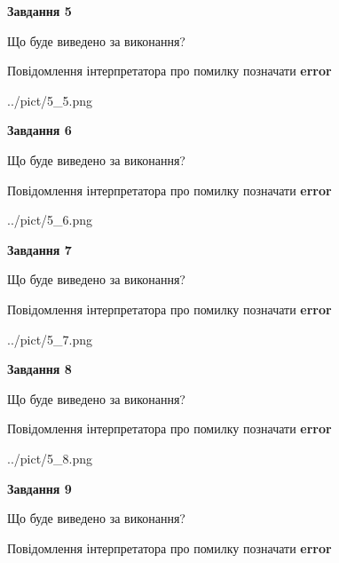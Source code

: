 \documentclass[11pt, ukrainian]{article}
\begin{document}
{\begin {large}
{\begin {center}\textbf{Завдання 5}\end {center}}\par
Що буде виведено за виконання? \par
Повідомлення інтерпретатора про помилку позначати \textbf{error}

\begin{center}
	{../pict/5_5.png}
\end{center}
\newpage

{\begin {center}\textbf{Завдання 6}\end {center}}\par
Що буде виведено за виконання? \par
Повідомлення інтерпретатора про помилку позначати \textbf{error}

\begin{center}
	{../pict/5_6.png}
\end{center}
\newpage

{\begin {center}\textbf{Завдання 7}\end {center}}\par
Що буде виведено за виконання? \par
Повідомлення інтерпретатора про помилку позначати \textbf{error}

\begin{center}
	{../pict/5_7.png}
\end{center}
\newpage

{\begin {center}\textbf{Завдання 8}\end {center}}\par
Що буде виведено за виконання? \par
Повідомлення інтерпретатора про помилку позначати \textbf{error}

\begin{center}
	{../pict/5_8.png}
\end{center}
\newpage

{\begin {center}\textbf{Завдання 9}\end {center}}\par
Що буде виведено за виконання? \par
Повідомлення інтерпретатора про помилку позначати \textbf{error}


\end{large}}
\end{document}
